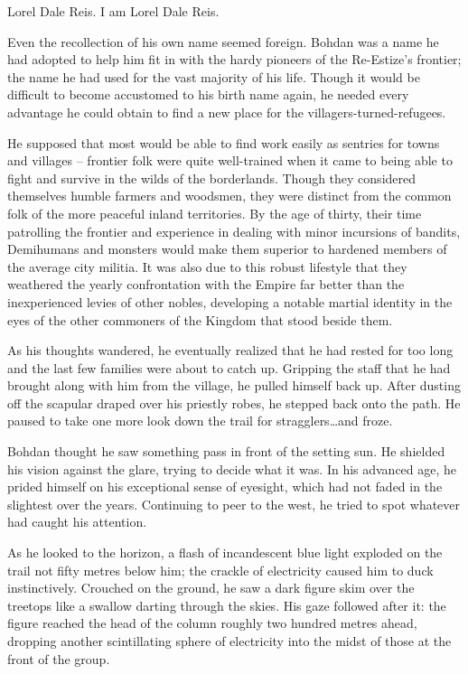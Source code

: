  

Lorel Dale Reis. I am Lorel Dale Reis.

 

Even the recollection of his own name seemed foreign. Bohdan was a name he had adopted to help him fit in with the hardy pioneers of the Re-Estize’s frontier; the name he had used for the vast majority of his life. Though it would be difficult to become accustomed to his birth name again, he needed every advantage he could obtain to find a new place for the villagers-turned-refugees.

 

He supposed that most would be able to find work easily as sentries for towns and villages – frontier folk were quite well-trained when it came to being able to fight and survive in the wilds of the borderlands. Though they considered themselves humble farmers and woodsmen, they were distinct from the common folk of the more peaceful inland territories. By the age of thirty, their time patrolling the frontier and experience in dealing with minor incursions of bandits, Demihumans and monsters would make them superior to hardened members of the average city militia. It was also due to this robust lifestyle that they weathered the yearly confrontation with the Empire far better than the inexperienced levies of other nobles, developing a notable martial identity in the eyes of the other commoners of the Kingdom that stood beside them.

 

As his thoughts wandered, he eventually realized that he had rested for too long and the last few families were about to catch up. Gripping the staff that he had brought along with him from the village, he pulled himself back up. After dusting off the scapular draped over his priestly robes, he stepped back onto the path. He paused to take one more look down the trail for stragglers…and froze.

 

Bohdan thought he saw something pass in front of the setting sun. He shielded his vision against the glare, trying to decide what it was. In his advanced age, he prided himself on his exceptional sense of eyesight, which had not faded in the slightest over the years. Continuing to peer to the west, he tried to spot whatever had caught his attention.

 

As he looked to the horizon, a flash of incandescent blue light exploded on the trail not fifty metres below him; the crackle of electricity caused him to duck instinctively. Crouched on the ground, he saw a dark figure skim over the treetops like a swallow darting through the skies. His gaze followed after it: the figure reached the head of the column roughly two hundred metres ahead, dropping another scintillating sphere of electricity into the midst of those at the front of the group.

